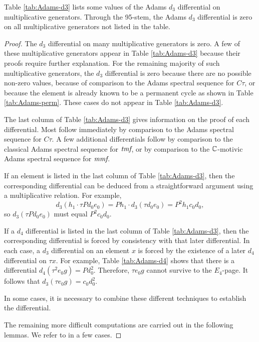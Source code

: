 \begin{thm}
\label{thm:Adams-d3}
Table \ref{tab:Adams-d3} lists some values of the
Adams $d_3$ differential on multiplicative generators.
Through the 95-stem, 
the Adams $d_3$ differential is zero on all multiplicative
generators not listed in the table.
\end{thm}


\begin{proof}
The $d_3$ differential on many multiplicative generators is zero.
A few of these multiplicative generators appear
in Table \ref{tab:Adams-d3} because their proofs require further
explanation.
For the remaining majority of such multiplicative generators,
the $d_3$ differential is zero
because there are no possible non-zero
values, because of comparison to the Adams spectral sequence for $C\tau$,
or because the element is already known to be a permanent cycle
as shown in Table \ref{tab:Adams-perm}.
These cases do not appear in Table \ref{tab:Adams-d3}.

The last column of Table \ref{tab:Adams-d3} gives information on the
proof of each differential.
Most follow immediately by comparison to
the Adams spectral sequence for $C\tau$.  
A few additional differentials follow by comparison to the classical
Adams spectral sequence for $\textit{tmf}$, or by comparison to the
$\mathbb{C}$-motivic Adams spectral sequence for $\textit{mmf}$.

If an element is listed in the last column of Table \ref{tab:Adams-d3}, 
then the corresponding differential can be deduced from a straightforward
argument using a multiplicative relation.  For example, 
\[
d_3( h_1 \cdot \tau P d_0 e_0 ) =
P h_1 \cdot d_3(\tau d_0 e_0) =
P^2 h_1 c_0 d_0,
\]
so $d_3(\tau P d_0 e_0)$ must equal $P^2 c_0 d_0$.

If a $d_4$ differential is listed in the last column of 
Table \ref{tab:Adams-d3}, then
the corresponding differential is forced by consistency with
that later differential.
In each case,
a $d_3$ differential on an element $x$
is forced by the existence of a later
$d_4$ differential on $\tau x$.
For example, Table \ref{tab:Adams-d4} shows that
there is a differential
$d_4(\tau^2 e_0 g) = P d_0^2$.
Therefore, $\tau e_0 g$ cannot survive to the $E_4$-page.
It follows that $d_3(\tau e_0 g) = c_0 d_0^2$.

In some cases, it is necessary to combine these different techniques to
establish the differential.

The remaining more difficult computations are carried out in the
following lemmas.  We refer to \cite{Chua21} in
a few cases.
\end{proof}

